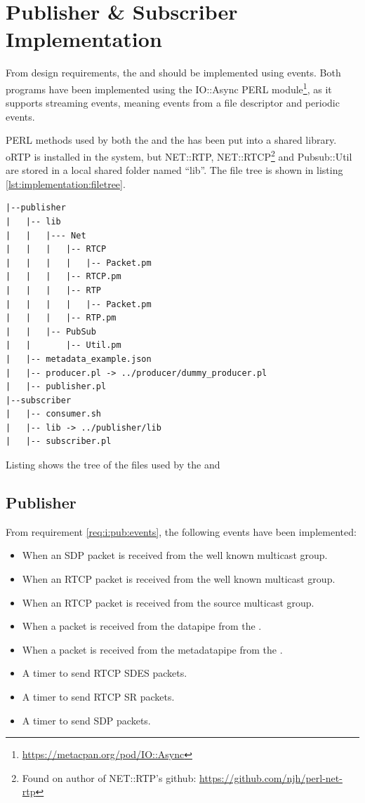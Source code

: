 \section{Publisher \& Subscriber Implementation} \label{sec:implementation:implpubsub}
From design requirements, the \pub{} and \sub{} should be implemented using events. Both programs have been implemented using the IO::Async PERL module\footnote{\url{https://metacpan.org/pod/IO::Async}}, as it supports streaming events, meaning events from a file descriptor and periodic events.

\noindent{}PERL methods used by both the \sub{} and the \pub{} has been put into a shared library. oRTP is installed in the system, but  NET::RTP, NET::RTCP\footnote{Found on author of NET::RTP's github: \url{https://github.com/njh/perl-net-rtp}} and Pubsub::Util are stored in a local shared folder named ``lib''. The file tree is shown in listing \ref{lst:implementation:filetree}.

\begin{listing}[H] 
	\begin{verbatim}
|--publisher
|   |-- lib
|   |   |--- Net
|   |   |   |-- RTCP
|   |   |   |   |-- Packet.pm
|   |   |   |-- RTCP.pm
|   |   |   |-- RTP
|   |   |   |   |-- Packet.pm
|   |   |   |-- RTP.pm
|   |   |-- PubSub
|   |       |-- Util.pm
|   |-- metadata_example.json
|   |-- producer.pl -> ../producer/dummy_producer.pl
|   |-- publisher.pl
|--subscriber
|   |-- consumer.sh
|   |-- lib -> ../publisher/lib
|   |-- subscriber.pl
\end{verbatim}
\caption{Listing shows the tree of the files used by the \sub{} and \pub{}}
\label{lst:implementation:filetree}
\end{listing}

\subsection{Publisher}
From requirement \ref{req:i:pub:events}, the following events have been implemented:
\begin{itemize}
	\item When an SDP packet is received from the well known multicast group.
	\item When an RTCP packet is received from the well known multicast group.
	\item When an RTCP packet is received from the source multicast group.
	\item When a packet is received from the datapipe from the \pro{}.
	\item When a packet is received from the metadatapipe from the \pro{}.
	\item A timer to send RTCP SDES packets.
	\item A timer to send RTCP SR packets.
	\item A timer to send SDP packets.
\end{itemize}

